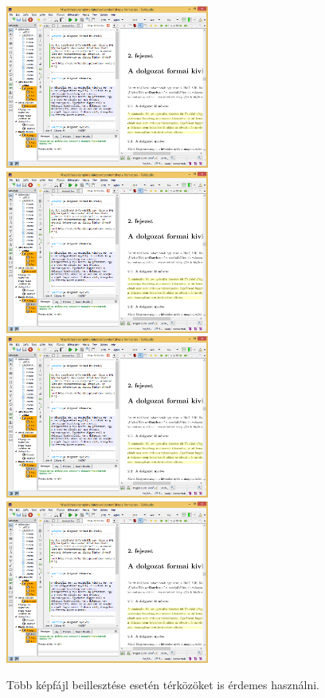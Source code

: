 \begin{figure}[!ht]
	\centering
	\includegraphics[width=67mm, keepaspectratio]{figures/TeXstudio.png}\hspace{1cm}
	\includegraphics[width=67mm, keepaspectratio]{figures/TeXstudio.png}\\\vspace{5mm}
	\includegraphics[width=67mm, keepaspectratio]{figures/TeXstudio.png}\hspace{1cm}
	\includegraphics[width=67mm, keepaspectratio]{figures/TeXstudio.png}
	\caption{Több képfájl beillesztése esetén térközöket is érdemes használni.} 
	\label{fig:HVSpaces}
\end{figure}

